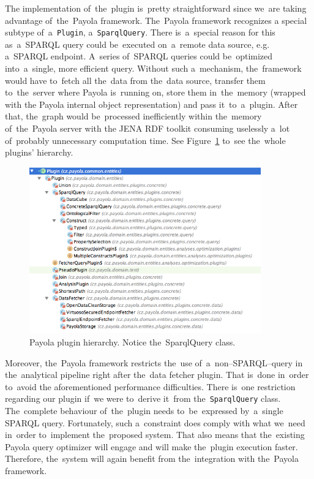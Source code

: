 The implementation of~the~plugin is~pretty straightforward since we~are 
taking advantage of~the~Payola framework. The~Payola framework recognizes a
special subtype of~a~\texttt{Plugin}, a~\texttt{SparqlQuery}. There is~a~special 
reason for this as~a~SPARQL query could be~executed on~a~remote data source, 
e.g. a~SPARQL endpoint. A~series of~SPARQL queries could be~optimized into~a~single, more efficient query. Without such a~mechanism, the~framework would
have to~fetch all the~data from the~data source, transfer them to~the~server 
where Payola is~running on, store them in~the~memory (wrapped with
the Payola internal object representation) and pass it~to~a~plugin. After that, the~graph would be~processed inefficiently within the~memory of~the~Payola server with 
the JENA RDF toolkit consuming uselessly a~lot of~probably unnecessary computation time. See 
Figure~\ref{fig:plugin-hierarchy} to~see the~whole plugins’ hierarchy.


\begin{figure}
	\centering
	\includegraphics[width=100mm]{img/plugin-hierarchy.png}
	\caption{Payola plugin hierarchy. Notice the~SparqlQuery class.}
	\label{fig:plugin-hierarchy}
\end{figure}

Moreover, the~Payola framework restricts the~use of~a~non--SPARQL--query 
in the~analytical pipeline right after the~data fetcher plugin. That is~done in~order to~avoid 
the aforementioned performance difficulties. There is~one restriction regarding our plugin if~we
were to~derive it~from the~\texttt{SparqlQuery} class. The~complete behaviour of~the~plugin needs to~be~expressed by~a~single SPARQL query. Fortunately, such a~constraint does 
comply with what we~need in~order to~implement the~proposed system. That also means
that the~existing Payola query optimizer will engage and 
will make the~plugin execution faster. Therefore, the~system will again 
benefit from the~integration with the~Payola framework.

